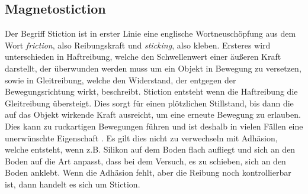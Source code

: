 \subsection{Magnetostiction}

Der Begriff Stiction ist in erster Linie eine englische Wortneuschöpfung aus dem Wort \textit{friction}, also Reibungskraft und \textit{sticking}, also kleben. Ersteres wird unterschieden in Haftreibung, welche den Schwellenwert einer äußeren Kraft darstellt, der überwunden werden muss um ein Objekt in Bewegung zu versetzen, sowie in Gleitreibung, welche den Widerstand, der entgegen der Bewegungsrichtung wirkt, beschreibt. Stiction entsteht wenn die Haftreibung die Gleitreibung übersteigt. Dies sorgt für einen plötzlichen Stillstand, bis dann die auf das Objekt wirkende Kraft ausreicht, um eine erneute Bewegung zu erlauben. Dies kann zu ruckartigen Bewegungen führen und ist deshalb in vielen Fällen eine unerwünschte Eigenschaft \cite{Ruel2014STICTIONT}. Es gilt dies nicht zu verwechseln mit Adhäsion, welche entsteht, wenn z.B. Silikon auf dem Boden flach aufliegt und sich an den Boden auf die Art anpasst, dass bei dem Versuch, es zu schieben, sich an den Boden anklebt. Wenn die Adhäsion fehlt, aber die Reibung noch kontrollierbar ist, dann handelt es sich um Stiction. \cite{Monkman_2019}


	
